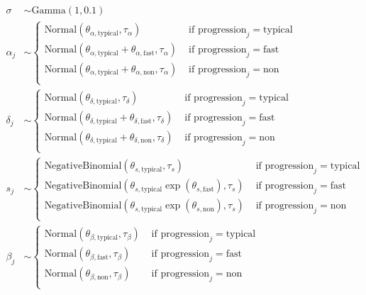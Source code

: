 \documentclass[12pt]{article}
\begin{document}
\begin{align*}
  \sigma & \sim \text{Gamma}(1,0.1)\\
  \alpha_j& \sim \begin{cases}
    \text{Normal}(\theta_{\alpha,\text{typical}},\tau_{\alpha})  &\text{ if } \text{progression}_j=\text{typical}\\
    \text{Normal}(\theta_{\alpha,\text{typical}}+\theta_{\alpha,\text{fast}},\tau_{\alpha}) &\text{ if } \text{progression}_j=\text{fast}\\
    \text{Normal}(\theta_{\alpha,\text{typical}}+\theta_{\alpha,\text{non}},\tau_{\alpha}) &\text{ if } \text{progression}_j=\text{non}\\
  \end{cases}\\
  \delta_j& \sim \begin{cases}
    \text{Normal}(\theta_{\delta,\text{typical}},\tau_{\delta})  &\text{ if } \text{progression}_j=\text{typical}\\
    \text{Normal}(\theta_{\delta,\text{typical}}+\theta_{\delta,\text{fast}},\tau_{\delta}) &\text{ if } \text{progression}_j=\text{fast}\\
    \text{Normal}(\theta_{\delta,\text{typical}}+\theta_{\delta,\text{non}},\tau_{\delta}) &\text{ if } \text{progression}_j=\text{non}\\
  \end{cases}\\
  s_j& \sim \begin{cases}
    \text{NegativeBinomial}(\theta_{s,\text{typical}},\tau_s)  &\text{ if } \text{progression}_j=\text{typical}\\
    \text{NegativeBinomial}(\theta_{s,\text{typical}}\exp(\theta_{s,\text{fast}}),\tau_s)  &\text{ if } \text{progression}_j=\text{fast}\\
    \text{NegativeBinomial}(\theta_{s,\text{typical}}\exp(\theta_{s,\text{non}}),\tau_s) &\text{ if } \text{progression}_j=\text{non}\\
  \end{cases}\\
  \beta_j& \sim \begin{cases}
    \text{Normal}(\theta_{\beta,\text{typical}},\tau_{\beta})  &\text{ if } \text{progression}_j=\text{typical}\\
    \text{Normal}(\theta_{\beta,\text{fast}},\tau_{\beta})  &\text{ if } \text{progression}_j=\text{fast}\\
    \text{Normal}(\theta_{\beta,\text{non}},\tau_{\beta})  &\text{ if } \text{progression}_j=\text{non}\\
  \end{cases}\\
\end{align*}
\end{document}
